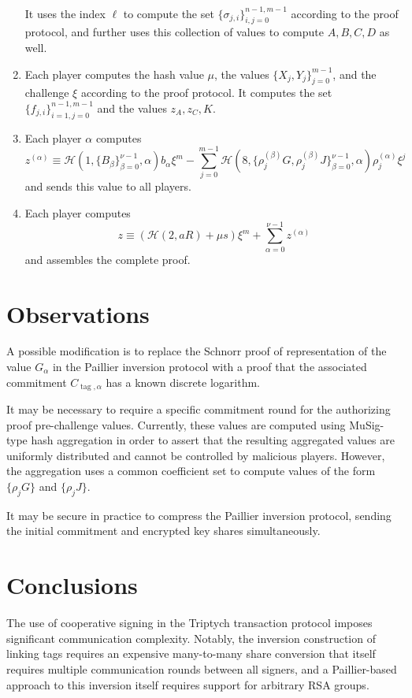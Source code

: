 \documentclass{article}
\newcommand{\hs}{\mathcal{H}}
\begin{document}
\begin{enumerate}
\begin{align*}
        \end{align*}
        It uses the index $\ell$ to compute the set $\{\sigma_{j,i}\}_{i,j=0}^{n-1,m-1}$ according to the proof protocol, and further uses this collection of values to compute $A, B, C, D$ as well.
    \item Each player computes the hash value $\mu$, the values $\{X_j,Y_j\}_{j=0}^{m-1}$, and the challenge $\xi$ according to the proof protocol.
    It computes the set $\{f_{j,i}\}_{i=1,j=0}^{n-1,m-1}$ and the values $z_A, z_C, K$.
    \item Each player $\alpha$ computes $$z^{(\alpha)} \equiv \hs(1, \{B_\beta\}_{\beta=0}^{\nu-1},\alpha) b_\alpha \xi^m - \sum_{j=0}^{m-1} \hs(8, \{\rho_j^{(\beta)}G, \rho_j^{(\beta)}J\}_{\beta=0}^{\nu-1}, \alpha) \rho_j^{(\alpha)}\xi^j$$ and sends this value to all players.
    \item Each player computes $$z \equiv (\hs(2, aR) + \mu s)\xi^m + \sum_{\alpha=0}^{\nu-1} z^{(\alpha)}$$ and assembles the complete proof.
\end{enumerate}


\section{Observations}

A possible modification is to replace the Schnorr proof of representation of the value $G_\alpha$ in the Paillier inversion protocol with a proof that the associated commitment $C_{\operatorname{tag},\alpha}$ has a known discrete logarithm.

It may be necessary to require a specific commitment round for the authorizing proof pre-challenge values.
Currently, these values are computed using MuSig-type hash aggregation in order to assert that the resulting aggregated values are uniformly distributed and cannot be controlled by malicious players.
However, the aggregation uses a common coefficient set to compute values of the form $\{\rho_j G\}$ and $\{\rho_j J\}$.

It may be secure in practice to compress the Paillier inversion protocol, sending the initial commitment and encrypted key shares simultaneously.


\section{Conclusions}

The use of cooperative signing in the Triptych transaction protocol imposes significant communication complexity.
Notably, the inversion construction of linking tags requires an expensive many-to-many share conversion that itself requires multiple communication rounds between all signers, and a Paillier-based approach to this inversion itself requires support for arbitrary RSA groups.
\end{document}
